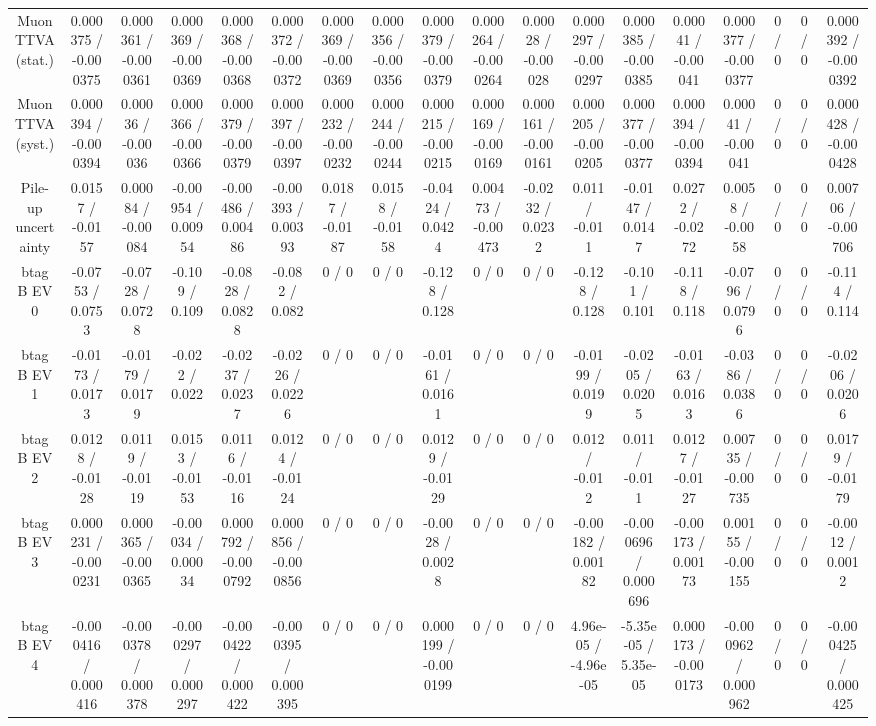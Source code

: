 \documentclass[10pt]{article}
\begin{document}
\begin{table}[htbp]
\begin{center}
\begin{tabular}{|c|c|c|c|c|c|c|c|c|c|c|c|c|c|c|c|c|c|}
  Muon TTVA (stat.) & 0.000375 / -0.000375 & 0.000361 / -0.000361 & 0.000369 / -0.000369 & 0.000368 / -0.000368 & 0.000372 / -0.000372 & 0.000369 / -0.000369 & 0.000356 / -0.000356 & 0.000379 / -0.000379 & 0.000264 / -0.000264 & 0.00028 / -0.00028 & 0.000297 / -0.000297 & 0.000385 / -0.000385 & 0.00041 / -0.00041 & 0.000377 / -0.000377 & 0 / 0 & 0 / 0 & 0.000392 / -0.000392 \\ 
  Muon TTVA (syst.) & 0.000394 / -0.000394 & 0.00036 / -0.00036 & 0.000366 / -0.000366 & 0.000379 / -0.000379 & 0.000397 / -0.000397 & 0.000232 / -0.000232 & 0.000244 / -0.000244 & 0.000215 / -0.000215 & 0.000169 / -0.000169 & 0.000161 / -0.000161 & 0.000205 / -0.000205 & 0.000377 / -0.000377 & 0.000394 / -0.000394 & 0.00041 / -0.00041 & 0 / 0 & 0 / 0 & 0.000428 / -0.000428 \\ 
  Pile-up uncertainty & 0.0157 / -0.0157 & 0.00084 / -0.00084 & -0.00954 / 0.00954 & -0.00486 / 0.00486 & -0.00393 / 0.00393 & 0.0187 / -0.0187 & 0.0158 / -0.0158 & -0.0424 / 0.0424 & 0.00473 / -0.00473 & -0.0232 / 0.0232 & 0.011 / -0.011 & -0.0147 / 0.0147 & 0.0272 / -0.0272 & 0.0058 / -0.0058 & 0 / 0 & 0 / 0 & 0.00706 / -0.00706 \\ 
  btag B EV 0 & -0.0753 / 0.0753 & -0.0728 / 0.0728 & -0.109 / 0.109 & -0.0828 / 0.0828 & -0.082 / 0.082 & 0 / 0 & 0 / 0 & -0.128 / 0.128 & 0 / 0 & 0 / 0 & -0.128 / 0.128 & -0.101 / 0.101 & -0.118 / 0.118 & -0.0796 / 0.0796 & 0 / 0 & 0 / 0 & -0.114 / 0.114 \\ 
  btag B EV 1 & -0.0173 / 0.0173 & -0.0179 / 0.0179 & -0.022 / 0.022 & -0.0237 / 0.0237 & -0.0226 / 0.0226 & 0 / 0 & 0 / 0 & -0.0161 / 0.0161 & 0 / 0 & 0 / 0 & -0.0199 / 0.0199 & -0.0205 / 0.0205 & -0.0163 / 0.0163 & -0.0386 / 0.0386 & 0 / 0 & 0 / 0 & -0.0206 / 0.0206 \\ 
  btag B EV 2 & 0.0128 / -0.0128 & 0.0119 / -0.0119 & 0.0153 / -0.0153 & 0.0116 / -0.0116 & 0.0124 / -0.0124 & 0 / 0 & 0 / 0 & 0.0129 / -0.0129 & 0 / 0 & 0 / 0 & 0.012 / -0.012 & 0.011 / -0.011 & 0.0127 / -0.0127 & 0.00735 / -0.00735 & 0 / 0 & 0 / 0 & 0.0179 / -0.0179 \\ 
  btag B EV 3 & 0.000231 / -0.000231 & 0.000365 / -0.000365 & -0.00034 / 0.00034 & 0.000792 / -0.000792 & 0.000856 / -0.000856 & 0 / 0 & 0 / 0 & -0.0028 / 0.0028 & 0 / 0 & 0 / 0 & -0.00182 / 0.00182 & -0.000696 / 0.000696 & -0.00173 / 0.00173 & 0.00155 / -0.00155 & 0 / 0 & 0 / 0 & -0.0012 / 0.0012 \\ 
  btag B EV 4 & -0.000416 / 0.000416 & -0.000378 / 0.000378 & -0.000297 / 0.000297 & -0.000422 / 0.000422 & -0.000395 / 0.000395 & 0 / 0 & 0 / 0 & 0.000199 / -0.000199 & 0 / 0 & 0 / 0 & 4.96e-05 / -4.96e-05 & -5.35e-05 / 5.35e-05 & 0.000173 / -0.000173 & -0.000962 / 0.000962 & 0 / 0 & 0 / 0 & -0.000425 / 0.000425 \\ 

\end{tabular}
\end{center}
\end{table}
\end{document}
